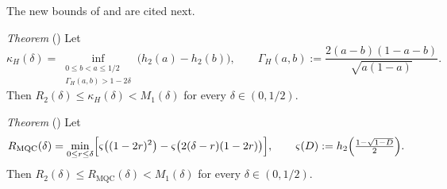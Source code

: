 \documentclass[11pt]{amsart}
\newcommand{\graybox}[1]{%
\begin{tcolorbox}[
  width=\linewidth,
  left=1mm,
  right=1mm,
  boxsep=0pt,
  boxrule=0.5pt,
  sharp corners,
  colback=white!95!black]
#1
\end{tcolorbox}
}
\theoremstyle{plain}
\theoremstyle{remark}
\begin{document}
\vspace*{.2in}
The new bounds of \cite{OAI26} and \cite{AG26} are cited next.
\graybox
{{\em Theorem} (\cite[Eq.~(2)]{OAI26}) 
Let
   \begin{equation}\label{eq:OAI improved}
 \kappa_H(\delta)=\!\!\inf_{\substack{0\le b<a\le1/2\\ \Gamma_H(a,b)>1-2\delta}}\!\!
 \bigl(h_2(a)-h_2(b)\bigr),  \qquad
        \Gamma_H(a,b):=\frac{2(a-b)(1-a-b)}{\sqrt{a(1-a)}}.
   \end{equation}
Then $R_2(\delta)\le\kappa_H(\delta)<M_1(\delta)$ for every $\delta\in(0,1/2)$.}

\graybox
{{\em Theorem} (\cite[Theorem 2]{AG26}) Let
\begin{equation}\label{eq:AG-improved}
 R_{\mathrm{MQC}}(\delta)=\min_{0\le r\le\delta}
 \Bigl[\varsigma\bigl((1-2r)^2\bigr)-\varsigma\bigl(2(\delta-r)(1-2r)\bigr)\Bigr],
 \qquad \varsigma(D):=h_2\Bigl(\tfrac{1-\sqrt{1-D}}2\Bigr).
\end{equation}
Then $R_2(\delta)\le R_{\mathrm{MQC}}(\delta)<M_1(\delta)$ for every $\delta\in(0,1/2)$.}
\end{document}
